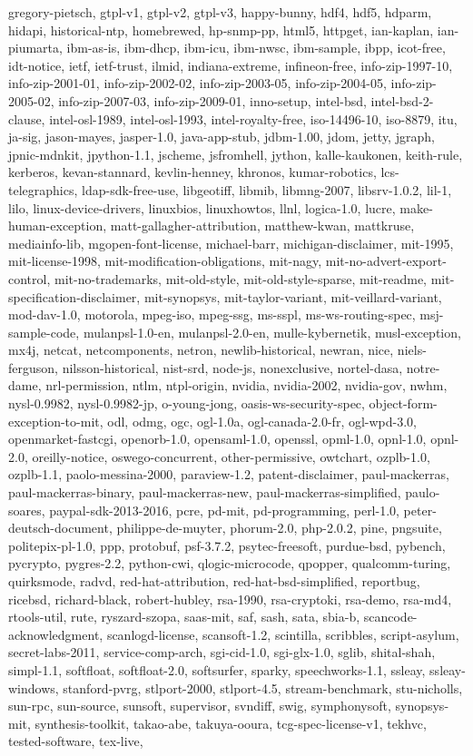 \documentclass[10pt]{article} %
\begin{document}
gregory-pietsch, gtpl-v1, gtpl-v2, gtpl-v3, happy-bunny, hdf4, hdf5, hdparm, hidapi, historical-ntp, homebrewed, hp-snmp-pp, html5, httpget, ian-kaplan, ian-piumarta, ibm-as-is, ibm-dhcp, ibm-icu, ibm-nwsc, ibm-sample, ibpp, icot-free, idt-notice, ietf, ietf-trust, ilmid, indiana-extreme, infineon-free, info-zip-1997-10, info-zip-2001-01, info-zip-2002-02, info-zip-2003-05, info-zip-2004-05, info-zip-2005-02, info-zip-2007-03, info-zip-2009-01, inno-setup, intel-bsd, intel-bsd-2-clause, intel-osl-1989, intel-osl-1993, intel-royalty-free, iso-14496-10, iso-8879, itu, ja-sig, jason-mayes, jasper-1.0, java-app-stub, jdbm-1.00, jdom, jetty, jgraph, jpnic-mdnkit, jpython-1.1, jscheme, jsfromhell, jython, kalle-kaukonen, keith-rule, kerberos, kevan-stannard, kevlin-henney, khronos, kumar-robotics, lcs-telegraphics, ldap-sdk-free-use, libgeotiff, libmib, libmng-2007, libsrv-1.0.2, lil-1, lilo, linux-device-drivers, linuxbios, linuxhowtos, llnl, logica-1.0, lucre, make-human-exception, matt-gallagher-attribution, matthew-kwan, mattkruse, mediainfo-lib, mgopen-font-license, michael-barr, michigan-disclaimer, mit-1995, mit-license-1998, mit-modification-obligations, mit-nagy, mit-no-advert-export-control, mit-no-trademarks, mit-old-style, mit-old-style-sparse, mit-readme, mit-specification-disclaimer, mit-synopsys, mit-taylor-variant, mit-veillard-variant, mod-dav-1.0, motorola, mpeg-iso, mpeg-ssg, ms-sspl, ms-ws-routing-spec, msj-sample-code, mulanpsl-1.0-en, mulanpsl-2.0-en, mulle-kybernetik, musl-exception, mx4j, netcat, netcomponents, netron, newlib-historical, newran, nice, niels-ferguson, nilsson-historical, nist-srd, node-js, nonexclusive, nortel-dasa, notre-dame, nrl-permission, ntlm, ntpl-origin, nvidia, nvidia-2002, nvidia-gov, nwhm, nysl-0.9982, nysl-0.9982-jp, o-young-jong, oasis-ws-security-spec, object-form-exception-to-mit, odl, odmg, ogc, ogl-1.0a, ogl-canada-2.0-fr, ogl-wpd-3.0, openmarket-fastcgi, openorb-1.0, opensaml-1.0, openssl, opml-1.0, opnl-1.0, opnl-2.0, oreilly-notice, oswego-concurrent, other-permissive, owtchart, ozplb-1.0, ozplb-1.1, paolo-messina-2000, paraview-1.2, patent-disclaimer, paul-mackerras, paul-mackerras-binary, paul-mackerras-new, paul-mackerras-simplified, paulo-soares, paypal-sdk-2013-2016, pcre, pd-mit, pd-programming, perl-1.0, peter-deutsch-document, philippe-de-muyter, phorum-2.0, php-2.0.2, pine, pngsuite, politepix-pl-1.0, ppp, protobuf, psf-3.7.2, psytec-freesoft, purdue-bsd, pybench, pycrypto, pygres-2.2, python-cwi, qlogic-microcode, qpopper, qualcomm-turing, quirksmode, radvd, red-hat-attribution, red-hat-bsd-simplified, reportbug, ricebsd, richard-black, robert-hubley, rsa-1990, rsa-cryptoki, rsa-demo, rsa-md4, rtools-util, rute, ryszard-szopa, saas-mit, saf, sash, sata, sbia-b, scancode-acknowledgment, scanlogd-license, scansoft-1.2, scintilla, scribbles, script-asylum, secret-labs-2011, service-comp-arch, sgi-cid-1.0, sgi-glx-1.0, sglib, shital-shah, simpl-1.1, softfloat, softfloat-2.0, softsurfer, sparky, speechworks-1.1, ssleay, ssleay-windows, stanford-pvrg, stlport-2000, stlport-4.5, stream-benchmark, stu-nicholls, sun-rpc, sun-source, sunsoft, supervisor, svndiff, swig, symphonysoft, synopsys-mit, synthesis-toolkit, takao-abe, takuya-ooura, tcg-spec-license-v1, tekhvc, tested-software, tex-live, 
\end{document}
